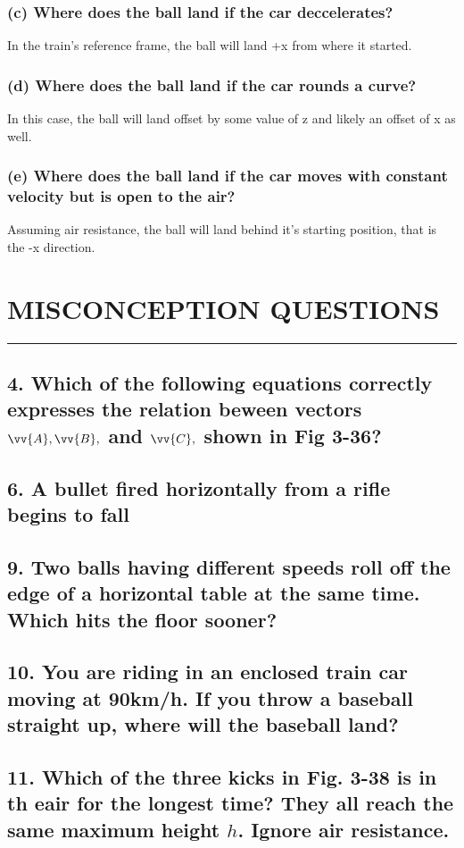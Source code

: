 \documentclass[12pt,a4paper,english]{article}
\begin{document}
\begin{flushleft}
  \subsubsection{(c) Where does the ball land if the car deccelerates?}
  In the train's reference frame, the ball will land +x from where it started.
  \subsubsection{(d) Where does the ball land if the car rounds a curve?}
  In this case, the ball will land offset by some value of z and likely an offset of x as well.
  \subsubsection{(e) Where does the ball land if the car moves with constant velocity but is open to the air?}
  Assuming air resistance, the ball will land behind it's starting position, that is the -x direction.
  \section*{MISCONCEPTION QUESTIONS}
  \hrule
  \subsection{4. Which of the following equations correctly expresses the relation beween vectors $\vv{A}, \vv{B},$ and $\vv{C},$ shown in Fig 3-36?}
  \subsection{6. A bullet fired horizontally from a rifle begins to fall}
  \subsection{9. Two balls having different speeds roll off the edge of a horizontal table at the same time. Which hits the floor sooner?}
  \subsection{10. You are riding in an enclosed train car moving at 90km/h. If you throw a baseball straight up, where will the baseball land?}
  \subsection{11. Which of the three kicks in Fig. 3-38 is in th eair for the longest time? They all reach the same maximum height $h$. Ignore air resistance.}

\end{flushleft}
\end{document}
